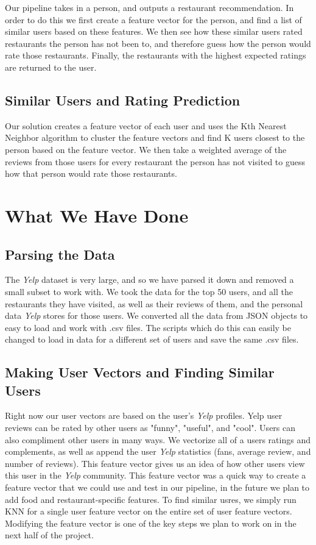 \documentclass[10pt,twocolumn,letterpaper]{article}
\begin{document}
Our pipeline takes in a person, and outputs a restaurant recommendation. In order to do this we first create a feature vector for the person, and find a list of similar users based on these features. We then see how these similar users rated restaurants the person has not been to, and therefore guess how the person would rate those restaurants. Finally, the restaurants with the highest expected ratings are returned to the user.
\subsection{Similar Users and Rating Prediction}
Our solution creates a feature vector of each user and uses the Kth Nearest Neighbor algorithm to cluster the feature vectors and find K users closest to the person based on the feature vector. We then take a weighted average of the reviews from those users for every restaurant the person has not visited to guess how that person would rate those restaurants.

\section{What We Have Done}
\subsection{Parsing the Data}
The \textit{Yelp} dataset is very large, and so we have parsed it down and removed a small subset to work with. We took the data for the top 50 users, and all the restaurants they have visited, as well as their reviews of them, and the personal data \textit{Yelp} stores for those users. We converted all the data from JSON objects to easy to load and work with .csv files. The scripts which do this can easily be changed to load in data for a different set of users and save the same .csv files.
\subsection{Making User Vectors and Finding Similar Users}
Right now our user vectors are based on the user's \textit{Yelp} profiles. Yelp user reviews can be rated by other users as "funny", "useful", and "cool". Users can also compliment other users in many ways. We vectorize all of a users ratings and complements, as well as append the user \textit{Yelp} statistics (fans, average review, and number of reviews). This feature vector gives us an idea of how other users view this user in the \textit{Yelp} community. This feature vector was a quick way to create a feature vector that we could use and test in our pipeline, in the future we plan to add food and restaurant-specific features. To find similar usres, we simply run KNN for a single user feature vector on the entire set of user feature vectors. Modifying the feature vector is one of the key steps we plan to work on in the next half of the project.
\end{document}
